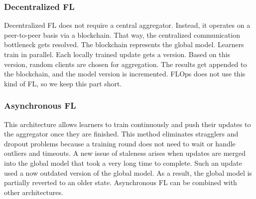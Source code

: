 \subsubsection{Decentralized FL}
Decentralized FL does not require a central aggregator.
Instead, it operates on a peer-to-peer basis via a blockchain.
That way, the centralized communication bottleneck gets resolved.
The blockchain represents the global model.
Learners train in parallel.
Each locally trained update gets a version.
Based on this version, random clients are chosen for aggregation.
The results get appended to the blockchain, and the model version is incremented.
FLOps does not use this kind of FL, so we keep this part short.

\subsubsection{Asynchronous FL}
This architecture allows learners to train continuously and push
their updates to the aggregator once they are finished.
This method eliminates stragglers and dropout problems because
a training round does not need to wait or handle outliers and timeouts.
A new issue of staleness arises when updates are merged into the global model
that took a very long time to complete.
Such an update used a now outdated version of the global model.
As a result, the global model is partially reverted to an older state.
Asynchronous FL can be combined with other architectures.